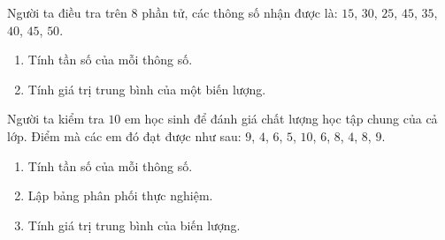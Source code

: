 \begin{bt}%
Người ta điều tra trên $8$ phần tử, các thông số nhận được là: $15$, $30$, $25$, $45$, $35$, $40$, $45$, $50$.
\begin{enumerate}
\item Tính tần số của mỗi thông số.
\item Tính giá trị trung bình của một biến lượng.
\end{enumerate}
\end{bt}

\begin{bt}%
Người ta kiểm tra $10$ em học sinh để đánh giá chất lượng học tập chung của cả lớp. Điểm mà các  em đó đạt được như sau: $9$, $4$, $6$, $5$, $10$, $6$, $8$, $4$, $8$, $9$.
\begin{enumerate}
\item Tính tần số của mỗi thông số.
\item Lập bảng phân phối thực nghiệm.
\item Tính giá trị trung bình của biến lượng.
\end{enumerate}
\end{bt}

